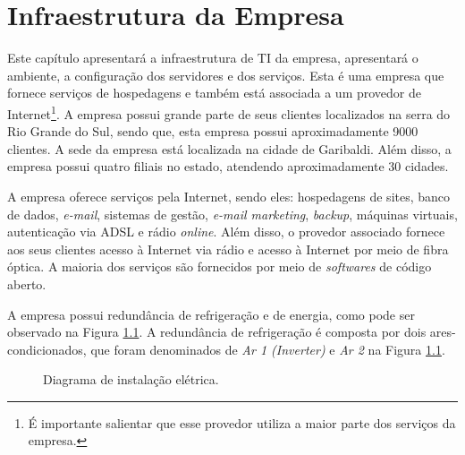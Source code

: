 \chapter{Infraestrutura da Empresa}
\label{cap:infraempresa}

Este capítulo apresentará a infraestrutura de \ac{TI} da empresa, apresentará o ambiente, a configuração dos servidores e dos serviços. Esta é 
uma empresa que fornece serviços de hospedagens e também está associada a um provedor de Internet\footnote[1]{É importante salientar que esse 
provedor utiliza a maior parte dos serviços da empresa.}. A empresa possui grande parte de seus clientes localizados na serra do Rio Grande do Sul, 
sendo que, esta empresa possui aproximadamente 9000 clientes. A sede da empresa está localizada na cidade de Garibaldi. Além disso, 
a empresa possui quatro filiais no estado, atendendo aproximadamente 30 cidades.

A empresa oferece serviços pela Internet, sendo eles: hospedagens de sites, banco de dados, \textit{e-mail}, sistemas de gestão, 
\textit{e-mail marketing}, \textit{backup}, máquinas virtuais, autenticação via \ac{ADSL} e rádio \textit{online}. Além disso, o provedor 
associado fornece aos seus clientes acesso à Internet via rádio e acesso à Internet por meio de fibra óptica. 
A maioria dos serviços são fornecidos por meio de \textit{softwares} de código aberto.

A empresa possui redundância de refrigeração e de energia, como pode ser observado na Figura \ref{fig:insteletrica}. 
A redundância de refrigeração é composta por dois ares-condicionados, que foram denominados de \textit{Ar 1 (Inverter)} e \textit{Ar 2} na 
Figura \ref{fig:insteletrica}.

\begin{figure}[h!]
 \centering
 \caption{Diagrama de instalação elétrica.}
 \label{fig:insteletrica}
\end{figure}

